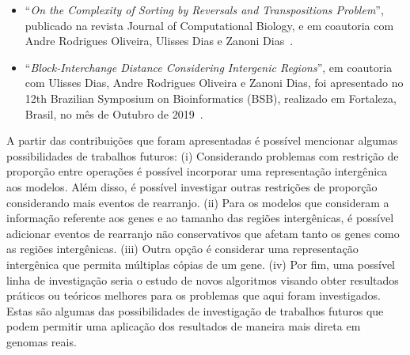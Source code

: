 \begin{itemize}
  \item ``\textit{On the Complexity of Sorting by Reversals and Transpositions Problem}'', publicado na revista Journal of Computational Biology, e em coautoria com Andre Rodrigues Oliveira, Ulisses Dias e Zanoni Dias~\cite{2019b-oliveira-etal}.

  \item ``\textit{Block-Interchange Distance Considering Intergenic Regions}'', em coautoria com Ulisses Dias, Andre Rodrigues Oliveira e Zanoni Dias, foi apresentado no 12th Brazilian Symposium on Bioinformatics (BSB), realizado em Fortaleza, Brasil, no mês de Outubro de 2019~\cite{2019-dias-etal}.
\end{itemize}

A partir das contribuições que foram apresentadas é possível mencionar algumas possibilidades de trabalhos futuros: (i) Considerando problemas com restrição de proporção entre operações é possível incorporar uma representação intergênica aos modelos. Além disso, é possível investigar outras restrições de proporção considerando mais eventos de rearranjo. (ii) Para os modelos que consideram a informação referente aos genes e ao tamanho das regiões intergênicas, é possível adicionar eventos de rearranjo não conservativos que afetam tanto os genes como as regiões intergênicas. (iii) Outra opção é considerar uma representação intergênica que permita múltiplas cópias de um gene. (iv) Por fim, uma possível linha de investigação seria o estudo de novos algoritmos visando obter resultados práticos ou teóricos melhores para os problemas que aqui foram investigados.  Estas são algumas das possibilidades de investigação de trabalhos futuros que podem permitir uma aplicação dos resultados de maneira mais direta em genomas reais. 